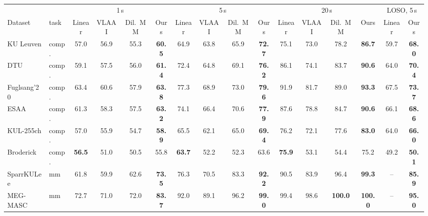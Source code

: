 \begin{tabular}{ll|cccc|cccc|cccc|cc}\toprule
 & & \multicolumn{4}{c|}{1\,s} & \multicolumn{4}{c|}{5\,s} & \multicolumn{4}{c|}{20\,s} & \multicolumn{2}{c}{LOSO, 5\,s} \\
Dataset & task & Linear & VLAAI & Dil.\ MM & Ours & Linear & VLAAI & Dil.\ MM & Ours & Linear & VLAAI & Dil.\ MM & Ours & Linear & Ours \\\midrule
KU Leuven & comp. & 57.0 & 56.9 & 55.3 & \textbf{60.5} & 64.9 & 63.8 & 65.9 & \textbf{72.7} & 75.1 & 73.0 & 78.2 & \textbf{86.7} & 59.7 & \textbf{68.0} \\
DTU & comp. & 59.1 & 57.5 & 56.0 & \textbf{61.4} & 72.4 & 64.8 & 69.1 & \textbf{76.2} & 86.1 & 74.1 & 83.7 & \textbf{90.6} & 64.0 & \textbf{70.4} \\
Fuglsang'20 & comp. & 63.4 & 60.6 & 57.9 & \textbf{63.8} & 77.3 & 68.9 & 73.0 & \textbf{79.6} & 91.9 & 81.7 & 89.0 & \textbf{93.3} & 67.5 & \textbf{73.7} \\
ESAA & comp. & 61.3 & 58.3 & 57.5 & \textbf{63.2} & 74.1 & 66.4 & 70.6 & \textbf{77.9} & 87.6 & 78.8 & 84.7 & \textbf{90.6} & 66.1 & \textbf{68.6} \\
KUL-255ch & comp. & 57.0 & 55.9 & 54.7 & \textbf{58.9} & 65.5 & 62.1 & 65.0 & \textbf{69.4} & 76.2 & 72.1 & 77.6 & \textbf{83.0} & 64.0 & \textbf{66.0} \\
Broderick & comp. & \textbf{56.5} & 51.0 & 50.5 & 55.8 & \textbf{63.7} & 52.2 & 52.3 & 63.6 & \textbf{75.9} & 53.1 & 54.4 & 75.2 & 49.2 & \textbf{50.1} \\
\midrule
SparrKULee & mm & 61.8 & 59.9 & 62.6 & \textbf{73.5} & 76.3 & 70.5 & 83.3 & \textbf{92.2} & 90.5 & 83.9 & 96.4 & \textbf{99.3} & -- & \textbf{85.9} \\
MEG-MASC & mm & 72.7 & 71.0 & 72.0 & \textbf{83.7} & 92.0 & 89.1 & 96.2 & \textbf{99.0} & 99.4 & 98.6 & \textbf{100.0} & \textbf{100.0} & -- & \textbf{95.0} \\
\bottomrule\end{tabular}
